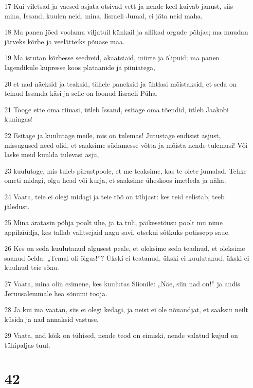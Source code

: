 \par 17 Kui viletsad ja vaesed asjata otsivad vett ja nende keel kuivab janust, siis mina, Issand, kuulen neid, mina, Iisraeli Jumal, ei jäta neid maha.
\par 18 Ma panen jõed voolama viljatuil künkail ja allikad orgude põhjas; ma muudan järveks kõrbe ja veelätteiks põuase maa.
\par 19 Ma istutan kõrbesse seedreid, akaatsiaid, mürte ja õlipuid; ma panen lagendikule küpresse koos plataanide ja piiniatega,
\par 20 et nad näeksid ja teaksid, tähele paneksid ja ühtlasi mõistaksid, et seda on teinud Issanda käsi ja selle on loonud Iisraeli Püha.
\par 21 Tooge ette oma riiuasi, ütleb Issand, esitage oma tõendid, ütleb Jaakobi kuningas!
\par 22 Esitage ja kuulutage meile, mis on tulemas! Jutustage endisist asjust, missugused need olid, et saaksime südamesse võtta ja mõista nende tulemusi! Või laske meid kuulda tulevasi asju,
\par 23 kuulutage, mis tuleb pärastpoole, et me teaksime, kas te olete jumalad. Tehke ometi midagi, olgu head või kurja, et saaksime üheskoos imetleda ja näha.
\par 24 Vaata, teie ei olegi midagi ja teie töö on tühjast: kes teid eelistab, teeb jäledust.
\par 25 Mina äratasin põhja poolt ühe, ja ta tuli, päikesetõusu poolt mu nime appihüüdja, kes tallab valitsejaid nagu savi, otsekui sõtkuks potissepp saue.
\par 26 Kes on seda kuulutanud algusest peale, et oleksime seda teadnud, et oleksime saanud öelda: „Temal oli õigus!”? Ükski ei teatanud, ükski ei kuulutanud, ükski ei kuulnud teie sõnu.
\par 27 Vaata, mina olin esimene, kes kuulutas Siionile: „Näe, siin nad on!” ja andis Jeruusalemmale hea sõnumi tooja.
\par 28 Ja kui ma vaatan, siis ei olegi kedagi, ja neist ei ole nõuandjat, et saaksin neilt küsida ja nad annaksid vastuse.
\par 29 Vaata, nad kõik on tühised, nende teod on eimiski, nende valatud kujud on tühipaljas tuul.

\chapter{42}

